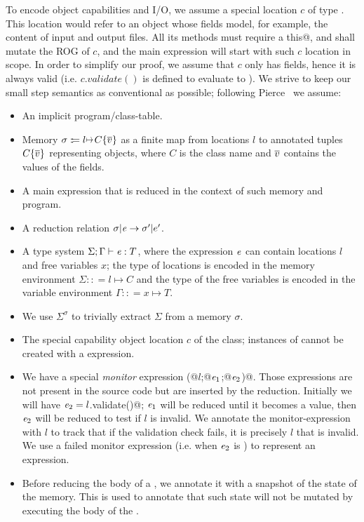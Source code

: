 To encode object capabilities and I/O, we assume a special location
$c$ of type \Q@Cap@.
This location would refer to an object whose fields model, for example, the content of input and output files.
All its methods must require a \Q@mut this@, and shall mutate the ROG of $c$, and the main expression will start with
such $c$ location in scope. In order to simplify our proof, we assume that $c$ only has \Q@mut@ fields, hence it is always valid (i.e. $c.validate()$ is defined to evaluate to \Q@true@).
We strive to keep our small step semantics as conventional as possible; following Pierce~\cite{pierce2002types} we assume:
\begin{itemize}
\item An implicit program/class-table.
\item Memory $\sigma:\!:\!= l\mapsto C\{\Many{v}\}$ as a finite map from locations $l$ to annotated tuples $C\{\hspace{0.03ex} \overline{\hspace{-0.03ex}v\hspace{-0.03ex}} \hspace{0.03ex}\}$ representing objects,
where $C$ is the class name and $\hspace{0.03ex} \overline{\hspace{-0.03ex}v\hspace{-0.03ex}} \hspace{0.03ex}$ contains the values of the fields.
\item A main expression that is reduced in the context of such memory and program.
\item A reduction relation $\sigma|\e\rightarrow \sigma'|e'$.
\item A type system $\Sigma;\Gamma\vdash\e:T$, where 
the expression ${\mathit{e}}$ can contain locations $l$ and free variables $x$;
the type of locations is encoded in the memory environment $\Sigma:\!:\!= l\mapsto C$
and the type of the free variables is encoded in the variable environment $\Gamma:\!:\!= x\mapsto T$.
\item We use $\Sigma^\sigma$ to trivially extract $\Sigma$ from a memory $\sigma$.
\item The special capability object location $c$ of the \Q@Cap@ class; instances of \Q@Cap@ cannot be created with a \Q@new@ expression.
\item We have a special \emph{monitor} expression \Q@M(@$l$\Q@;@${\mathit{e}}_1$\Q@;@${\mathit{e}}_2$\Q@)@.
Those expressions are not present in the source code but are inserted by the reduction.
Initially we will have ${\mathit{e}}_2= l$\Q@.validate()@;
${\mathit{e}}_1$ will be reduced until it becomes a value, then
${\mathit{e}}_2$ will be reduced to test if $l$ is invalid. We annotate the monitor-expression with $l$ to track
that if the validation check fails, it is precisely $l$ that is invalid.
We use a failed monitor expression (i.e. when ${\mathit{e}}_2$ is \Q@false@) to represent an \Q@error@ expression.
\item Before reducing the body of a \Q@try@, we annotate it with a snapshot of 
the state of the memory. This is used to annotate that such state will not be mutated by executing the body of the \Q@try@.
\end{itemize}

